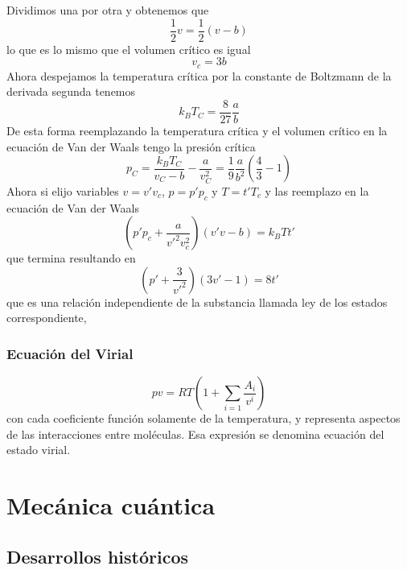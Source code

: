 \documentclass{book}
\numberwithin{equation}{section} %
\begin{document}
Dividimos una por otra y obtenemos que
\[ \frac{1}{2} v = \frac{1}{2} (v - b) \]
lo que es lo mismo que el volumen crítico es igual
\begin{equation}
    v_c = 3 b
\end{equation}
Ahora despejamos la temperatura crítica por la constante de Boltzmann de la derivada segunda tenemos
\begin{equation}
    k_B T_C = \frac{8}{27} \frac{a}{b}
\end{equation}
De esta forma reemplazando la temperatura crítica y el volumen crítico en la ecuación de Van der Waals tengo la presión crítica
\begin{equation}
p_C = \frac{k_B T_C}{v_C - b} - \frac{a}{v^2_C} = \frac{1}{9} \frac{a}{b^2} \left(\frac{4}{3} - 1\right)
\end{equation}
Ahora si elijo variables $v = v' v_c$, $p = p' p_c$ y $T = t' T_c$ y las reemplazo en la ecuación de Van der Waals
\[ \left(p' p_c + \frac{a}{v'^2 v^2_c}\right) (v' v - b) = k_B T t' \]
que termina resultando en
\begin{equation}
\left(p' + \frac{3}{v'^2}\right)(3 v' - 1) = 8 t'
\label{eq:gases_estados_correspondientes}
\end{equation}
que es una relación independiente de la substancia llamada ley de los estados correspondiente, 

\subsection{Ecuación del Virial}

\begin{equation}
p v = RT \left( 1 + \sum_{i = 1} \frac{A_i}{v^i}\right)
\end{equation}
con cada coeficiente función solamente de la temperatura, y representa aspectos de las interacciones entre moléculas.
Esa expresión se denomina ecuación del estado virial.



\chapter{Mecánica cuántica}

\section{Desarrollos históricos}
\end{document}
